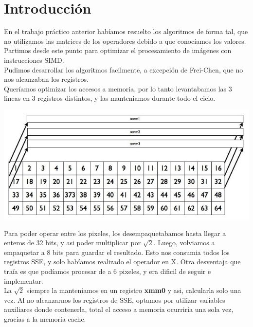 \documentclass[a4paper, 10pt]{article}
\begin{document}
\newpage

\section{Introducci\'on}

En el trabajo pr\'actico anterior hab\'iamos resuelto los algoritmos de forma tal, que no utilizamos las matrices de los operadores debido a que conoc\'iamos los valores.
Partimos desde este punto para optimizar el procesamiento de im\'agenes con instrucciones SIMD. \\

Pudimos desarrollar los algoritmos facilmente, a excepci\'on de Frei-Chen, que no nos alcanzaban los registros. \\

Quer\'iamos optimizar los accesos a memoria, por lo tanto levantabamos las 3 lineas en 3 registros distintos, y las manteniamos durante todo el ciclo.

\begin{center}
	\includegraphics[scale=0.70]{Graficos/graph1.jpg}
\end{center}

Para poder operar entre los pixeles, los desempaquetabamos hasta llegar a enteros de 32 bits, y asi poder multiplicar por $\sqrt{2}$. 
Luego, volviamos a empaquetar a 8 bits para guardar el resultado.
Esto nos consumia todos los registros SSE, y solo hab\'iamos realizado el operador en X. Otra desventaja que tra\'ia es que pod\'iamos procesar de a 6 pixeles, y era dificil de seguir e implementar. \\

La $\sqrt{2}$ siempre la manten\'iamos en un registro \textbf{xmm0} y asi, calcularla solo una vez.
Al no alcanzarnos los registros de SSE, optamos por utilizar variables auxiliares donde contenerla, total el acceso a memoria ocurrir\'ia una sola vez, gracias a la memoria cache. \\
\end{document}

